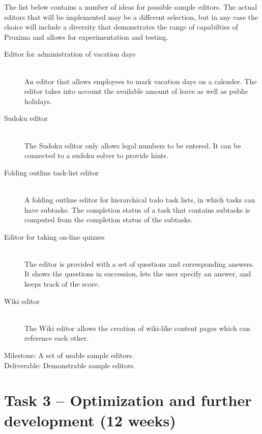 \documentclass[10pt]{article}
\begin{document}
The list below contains a number of ideas for possible sample editors. The actual editors that will be implemented may be a different selection, but in any case the choice will include a diversity that demonstrates the range of capabilties of Proxima and allows for experimentation and testing.

\begin{description}

\item[Editor for administration of vacation days]~\\
An editor that allows employees to mark vacation days on a calender. The editor takes into account the available amount of leave as well as public holidays.

\item[Sudoku editor]~\\
The Sudoku editor only allows legal numbers to be entered. It can be connected to a sudoku solver to provide hints.

\item[Folding outline task-list editor]~\\
A folding outline editor for hierarchical todo task lists, in which tasks can have subtasks. The completion status of a task that contains subtasks is computed from the completion status of the subtasks.

%

\item[Editor for taking on-line quizzes]~\\
The editor is provided with a set of questions and corresponding answers. It shows the questions in succession, lets the user specify an answer, and keeps track of the score.

\item[Wiki editor]~\\
The Wiki editor allows the creation of wiki-like content pages which can reference each other.

\end{description}


{\sc Milestone:} A set of usable sample editors.\\
{\sc Deliverable:} Demonstrable sample editors.

\section*{Task 3 -- Optimization and further development (12 weeks)}
\end{document}
